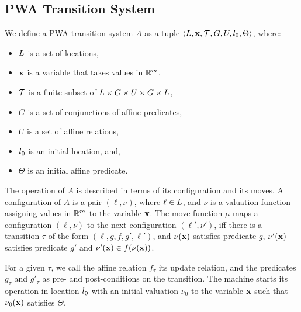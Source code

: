 \subsection{PWA Transition System}

We define a PWA transition system $A$ as a tuple
$\left\langle L,\mathbf{x},\mathcal{T}, G, U, l_0,\Theta \right \rangle$, where:
\begin{itemize}[noitemsep, leftmargin= 1.5 em]
\item
$L$ is a set of locations,
\item
$\mathbf{x}$ is a variable that takes values in $\mathbb{R}^m$,
\item
$\mathcal{T}$ is a finite subset of $L \times G \times U \times G \times L$, 
\item
$G$ is a set of conjunctions of affine predicates, 
\item
$U$ is a set of affine relations,
\item
$l_0$ is an initial location, and,
\item
$\Theta$ is an initial affine predicate.
\end{itemize}

The operation of $A$ is described in terms of its configuration and
its moves. A configuration of $A$ is a pair $(\ell, \nu)$, where $\ell
\in L$, and $\nu$ is a valuation function assigning values in
$\mathbb{R}^m$ to the variable $\mathbf{x}$.  The move function $\mu$ maps a
configuration $(\ell,\nu)$ to the next configuration $(\ell',\nu')$,
iff there is a transition $\tau$ of the form $(\ell,g,f,g',\ell')$,
and $\nu(\mathbf{x})$ satisfies predicate $g$, $\nu'(\mathbf{x})$ satisfies
predicate $g'$ and $\nu'(\mathbf{x}) \in f(\nu(\mathbf{x}))$.

For a given $\tau$, we call the affine relation $f_\tau$ its update
relation, and the predicates $g_\tau$ and $g'_\tau$ as pre- and
post-conditions on the transition. The machine starts its operation in
location $l_0$ with an initial valuation $\nu_0$ to the variable
$\mathbf{x}$ such that $\nu_0(\mathbf{x})$ satisfies $\Theta$.




